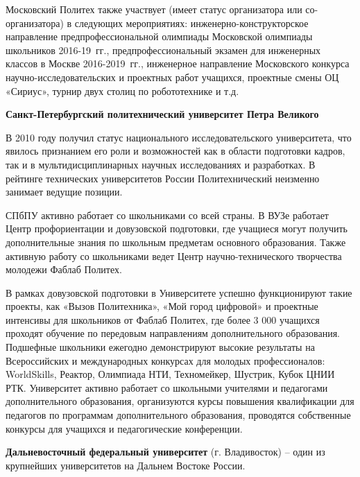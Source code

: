 Московский Политех также участвует (имеет статус организатора или со-\linebreak организатора) в следующих мероприятиях: инженерно-конструкторское направление предпрофессиональной олимпиады Московской олимпиады школьников 2016-19~гг., предпрофессиональный экзамен для инженерных классов в Москве 2016-2019~гг., инженерное направление Московского конкурса научно-исследовательских и проектных работ учащихся, проектные смены ОЦ «Сириус», турнир двух столиц по робототехнике и т.д.

\textbf{Санкт-Петербургский политехнический университет Петра Великого}

В 2010 году получил статус национального исследовательского университета, что явилось признанием его роли и возможностей как в области подготовки кадров, так и в мультидисциплинарных научных исследованиях и разработках. В рейтинге технических университетов России Политехнический неизменно занимает ведущие позиции.

СПбПУ активно работает со школьниками со всей страны. В ВУЗе работает Центр профориентации и довузовской подготовки, где учащиеся могут получить дополнительные знания по школьным предметам основного образования. Также активную работу со школьниками ведет Центр научно-технического творчества молодежи Фаблаб Политех.

В рамках довузовской подготовки в Университете успешно функционируют такие проекты, как «Вызов Политехника», «Мой город цифровой» и проектные интенсивы для школьников от Фаблаб Политех, где более 3 000 учащихся проходят обучение по передовым направлениям дополнительного образования. Подшефные школьники ежегодно демонстрируют высокие результаты на Всероссийских и международных конкурсах для молодых профессионалов: WorldSkills, Реактор, Олимпиада НТИ, Техномейкер, Шустрик, Кубок ЦНИИ РТК. Университет активно работает со школьными учителями и педагогами дополнительного образования, организуются курсы повышения квалификации для педагогов по программам дополнительного образования, проводятся собственные конкурсы для учащихся и педагогические конференции.

\textbf{Дальневосточный федеральный университет} (г. Владивосток) – один из крупнейших университетов на Дальнем Востоке России.

